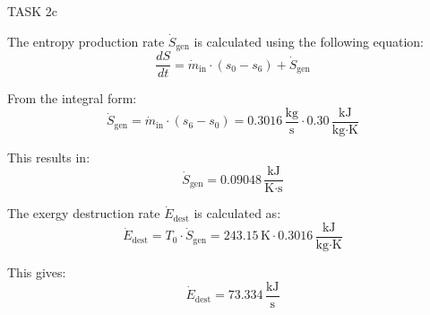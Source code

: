 TASK 2c

The entropy production rate \( \dot{S}_{\text{gen}} \) is calculated using the following equation:
\[
\frac{dS}{dt} = \dot{m}_{\text{in}} \cdot (s_0 - s_6) + \dot{S}_{\text{gen}}
\]

From the integral form:
\[
\dot{S}_{\text{gen}} = \dot{m}_{\text{in}} \cdot (s_6 - s_0) = 0.3016 \, \frac{\text{kg}}{\text{s}} \cdot 0.30 \, \frac{\text{kJ}}{\text{kg·K}}
\]

This results in:
\[
\dot{S}_{\text{gen}} = 0.09048 \, \frac{\text{kJ}}{\text{K·s}}
\]

The exergy destruction rate \( \dot{E}_{\text{dest}} \) is calculated as:
\[
\dot{E}_{\text{dest}} = T_0 \cdot \dot{S}_{\text{gen}} = 243.15 \, \text{K} \cdot 0.3016 \, \frac{\text{kJ}}{\text{kg·K}}
\]

This gives:
\[
\dot{E}_{\text{dest}} = 73.334 \, \frac{\text{kJ}}{\text{s}}
\]